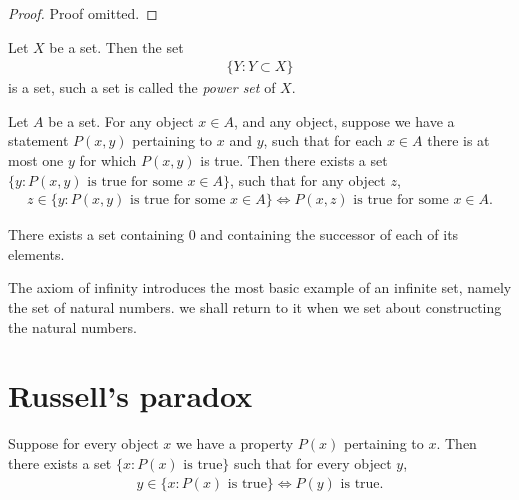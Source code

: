\begin{proof}
    Proof omitted.
\end{proof}

\begin{axiom}
    Let $X$ be a set. Then the set
    \begin{align*}
        \{Y : Y \subset X\}
    \end{align*}
    is a set, such a set is called the \emph{power set} of $X$.
\end{axiom}

\begin{axiom}
    Let $A$ be a set. For any object $x \in A$, and any object, suppose we have a statement $P(x, y)$ pertaining to $x$ and $y$, such that for each $x \in A$ there is at most one $y$ for which $P(x, y)$ is true. Then there exists a set $\{y : P(x, y) \text{ is true for some } x \in A\}$, such that for any object $z$,
    \begin{align*}
        z \in \{y : P(x, y) \text{ is true for some } x \in A\}
        \Longleftrightarrow
        P(x, z) \text{ is true for some } x \in A.
    \end{align*}
\end{axiom}

\begin{axiom}
    There exists a set containing $0$ and containing the successor of each of its elements.
\end{axiom}

The axiom of infinity introduces the most basic example of an infinite set, namely the set of natural numbers. we shall return to it when we set about constructing the natural numbers.

\section{Russell's paradox}

\begin{pseudoaxiom}
    Suppose for every object $x$ we have a property $P(x)$ pertaining to $x$. Then there exists a set $\{x : P(x) \text{ is true}\}$ such that for every object $y$,
    \begin{align*}
        y \in \{x : P(x) \text{ is true}\}
        \Longleftrightarrow
        P(y) \text{ is true}.
    \end{align*}
\end{pseudoaxiom}

